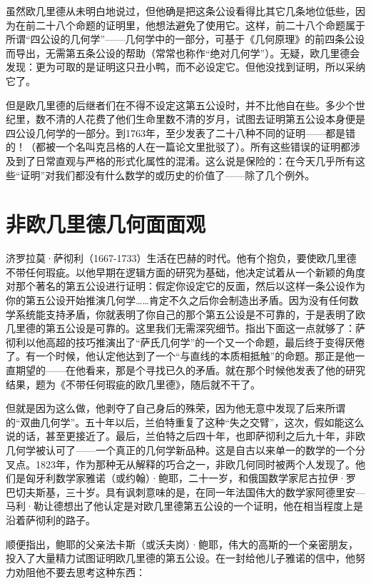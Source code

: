 虽然欧几里德从未明白地说过，但他确是把这条公设看得比其它几条地位低些，因为在前二十八个命题的证明里，他想法避免了使用它。这样，前二十八个命题属于所谓“四公设的几何学”——几何学中的一部分，可基于《几何原理》的前四条公设而导出，无需第五条公设的帮助（常常也称作“绝对几何学”）。无疑，欧几里德会发现：更为可取的是证明这只丑小鸭，而不必设定它。但他没找到证明，所以采纳它了。

但是欧几里德的后继者们在不得不设定这第五公设时，并不比他自在些。多少个世纪里，数不清的人花费了他们生命里数不清的岁月，试图去证明第五公设本身便是四公设几何学的一部分。到1763年，至少发表了二十八种不同的证明——都是错的！（都被一个名叫克吕格的人在一篇论文里批驳了）。所有这些错误的证明都涉及到了日常直观与严格的形式化属性的混淆。这么说是保险的：在今天几乎所有这些“证明”对我们都没有什么数学的或历史的价值了——除了几个例外。

\section{非欧几里德几何面面观}

济罗拉莫·萨彻利（1667-1733）生活在巴赫的时代。他有个抱负，要使欧几里德不带任何瑕疵。以他早期在逻辑方面的研究为基础，他决定试着从一个新颖的角度对那个著名的第五公设进行证明：假定你设定它的反面，然后以这样一条公设作为你的第五公设开始推演几何学……肯定不久之后你会制造出矛盾。因为没有任何数学系统能支持矛盾，你就表明了你自己的那个第五公设是不可靠的，于是表明了欧几里德的第五公设是可靠的。这里我们无需深究细节。指出下面这一点就够了：萨彻利以他高超的技巧推演出了“萨氏几何学”的一个又一个命题，最后终于变得厌倦了。有一个时候，他认定他达到了一个“与直线的本质相抵触”的命题。那正是他一直期望的——在他看来，那是个寻找已久的矛盾。就在那个时候他发表了他的研究结果，题为《不带任何瑕疵的欧几里德》，随后就不干了。

但就是因为这么做，他剥夺了自己身后的殊荣，因为他无意中发现了后来所谓的“双曲几何学”。五十年以后，兰伯特重复了这种“失之交臂”，这次，假如能这么说的话，甚至更接近了。最后，兰伯特之后四十年，也即萨彻利之后九十年，非欧几何学被认可了——一个真正的几何学新品种。这是自古以来单一的数学的一个分叉点。1823年，作为那种无从解释的巧合之一，非欧几何同时被两个人发现了。他们是匈牙利数学家雅诺（或约翰）·鲍耶，二十一岁，和俄国数学家尼古拉伊·罗巴切夫斯基，三十岁。具有讽刺意味的是，在同一年法国伟大的数学家阿德里安—马利·勒让德想出了他认定是对欧几里德第五公设的一个证明，他在相当程度上是沿着萨彻利的路子。

顺便指出，鲍耶的父亲法卡斯（或沃夫岗）·鲍耶，伟大的高斯的一个亲密朋友，投入了大量精力试图证明欧几里德的第五公设。在一封给他儿子雅诺的信中，他努力劝阻他不要去思考这种东西：

